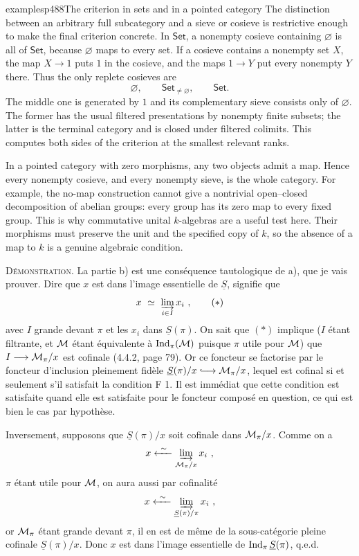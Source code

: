 \begin{dcomment}{examples}{p488}{The criterion in sets and in a pointed category}
The distinction between an arbitrary full subcategory and a sieve or cosieve is restrictive enough to make the final criterion concrete. In $\mathsf{Set}$, a nonempty cosieve containing $\varnothing$ is all of $\mathsf{Set}$, because $\varnothing$ maps to every set. If a cosieve contains a nonempty set $X$, the map $X\to1$ puts $1$ in the cosieve, and the maps $1\to Y$ put every nonempty $Y$ there. Thus the only replete cosieves are
\[
 \varnothing,\qquad\mathsf{Set}_{\ne\varnothing},\qquad\mathsf{Set}.
\]
The middle one is generated by $1$ and its complementary sieve consists only of $\varnothing$. The former has the usual filtered presentations by nonempty finite subsets; the latter is the terminal category and is closed under filtered colimits. This computes both sides of the criterion at the smallest relevant ranks.

In a pointed category with zero morphisms, any two objects admit a map. Hence every nonempty cosieve, and every nonempty sieve, is the whole category. For example, the no-map construction cannot give a nontrivial open--closed decomposition of abelian groups: every group has its zero map to every fixed group. This is why commutative unital $k$-algebras are a useful test here. Their morphisms must preserve the unit and the specified copy of $k$, so the absence of a map to $k$ is a genuine algebraic condition.
\end{dcomment}


\noindent\textsc{Démonstration}. La partie b) est une conséquence tautologique de a), que je vais prouver. Dire que $x$ est dans l'image essentielle de $\underline{S}$, signifie que
\[
x \ \simeq \ \varinjlim_{i\in I} x_i \ , \tag*{$(*)$}
\]
avec $I$ grande devant $\pi$ et les $x_i$ dans $\underline{S}(\pi)$. On sait que $(*)$ implique ($I$ étant filtrante, et $\mathcal{M}$ étant équivalente à $\operatorname{Ind}_\pi(\mathcal{M})$ puisque $\pi$ utile pour $\mathcal{M}$) que $I\longrightarrow\mathcal{M}_\pi/x$ est cofinale (4.4.2, page 79). Or ce foncteur se factorise par le foncteur d'inclusion pleinement fidèle $\underline{S}(\pi)/x\incl\cM_\pi/x$, lequel est cofinal si et seulement s'il satisfait la condition F 1. Il est immédiat que cette condition est satisfaite quand elle est satisfaite pour le foncteur composé en question, ce qui est bien le cas
par hypothèse.

\noindent Inversement, supposons que $\underline{S}(\pi)/x$ soit cofinale dans $\mathcal{M}_\pi/x$. Comme on a
\[
x \xleftarrow{\ \sim\ } \varinjlim_{\mathcal{M}_\pi/x} x_i \ ,
\]
$\pi$ étant utile pour $\mathcal{M}$, on aura aussi par cofinalité
\[
x \xleftarrow{\ \sim\ } \varinjlim_{\underline{S}(\pi)/\pi} x_i \ , %
\]
or $\mathcal{M}_\pi$ étant grande devant $\pi$, il en est de même de la sous-catégorie pleine cofinale $\underline{S}(\pi)/x$. Donc $x$ est dans l'image essentielle de $\operatorname{Ind}_\pi\underline{S}(\pi)$, q.e.d.

